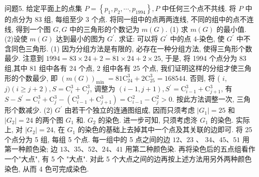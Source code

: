 问题5. 给定平面上的点集 $P=\left\{p_1, p_2, \cdots, p_{1994}\right\}, P$ 中任何三个点不共线.
将 $P$ 中的点分为 83 组, 每组至少 3 个点.
将同一组中的点两两连线, 不同的组中的点不连线, 得到一个图 $G, G$ 中的三角形的个数记为 $m(G)$.
(1) 求 $m(G)$ 的最小值.
(2)设使 $m(G)$ 达到最小的图为 $G^{\prime}$. 求证: 可以将 $G^{\prime}$ 中的点 4-染色, 使 $G^{\prime}$ 中不含同色三角形.
(1) 因为分组方法是有限的, 必存在一种分组方法, 使得三角形个数最少.
注意到 $1994=83 \times 24+2=81 \times 24+2 \times 25$, 于是, 将 1994 个点分为 83 组,其中 81 组中各有 24 个点, 2 组中各有 25 个点, 我们证明这样的分组才使三角形的个数最少, 即 $(m(G))_{\text {min }}=81 \mathrm{C}_{24}^3+2 \mathrm{C}_{25}^3=168544$. 否则, 将 ( $i$, $j)(i \geqslant j+2), S=\mathrm{C}_i^3+\mathrm{C}_j^3$, 调整为 $(i-1, j+1), S^{\prime}=\mathrm{C}_{i-1}^3+\mathrm{C}_{j+1}^3$, 有 $S- S^{\prime}=\mathrm{C}_i^3+\mathrm{C}_j^3-\left(\mathrm{C}_{i-1}^3+\mathrm{C}_{j+1}^3\right)=\mathrm{C}_{i-1}^2-\mathrm{C}_j^2>0$. 按此方法调整一次, 三角形个数减少.
(2) $G^{\prime}$ 由若干个独立的连通图组成, 因而只须考虑 $\left|G_1\right|=25$ 和 $\left|G_2\right|=24$ 的两个图 $G_1$ 和.
$G_2$ 的染色.
进一步可知, 只须考虑泈 $G_1$ 的染色.
实际上, 对 $\left|G_2\right|=24$, 在 $G_1$ 的染色的基础上去掉其中一个点及其关联的边即可.
将 25 个点分为 5 组, 每组 5 个点.
每一组中的 5 点之间的边 $12 、 23$ 、 $34 、 45 、 51$ 用第一种颜色染; 边 $13 、 35 、 52 、 24 、 41$ 用第二种颜色染.
再将染色后的五点组看作一个"大点", 有 5 个 "大点". 对此 5 个大点之间的边再按上述方法用另外两种颜色染色, 从而 4 色可完成染色.



